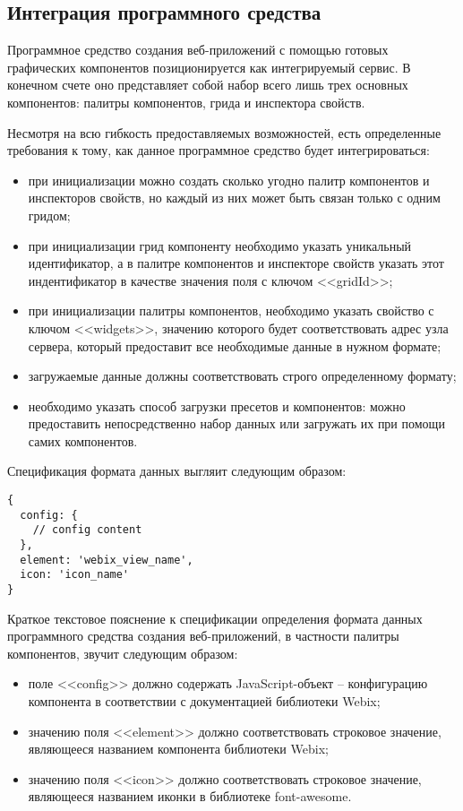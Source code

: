 \subsection{Интеграция программного средства}
\label{sec:manual:integration}

Программное средство создания веб-приложений с помощью готовых графических компонентов позиционируется как интегрируемый сервис. В конечном счете оно представляет собой набор всего лишь трех основных компонентов: палитры компонентов, грида и инспектора свойств. 

Несмотря на всю гибкость предоставляемых возможностей, есть определенные требования к тому, как данное программное средство будет интегрироваться:
\begin{itemize}
	\item при инициализации можно создать сколько угодно палитр компонентов и инспекторов свойств, но каждый из них может быть связан только с одним гридом;
	\item при инициализации грид компоненту необходимо указать уникальный идентификатор, а в палитре компонентов и инспекторе свойств указать этот индентификатор в качестве значения поля с ключом <<gridId>>;
	\item при инициализации палитры компонентов, необходимо указать свойство с ключом <<widgets>>, значению которого будет соответствовать адрес узла сервера, который предоставит все необходимые данные в нужном формате;
	\item загружаемые данные должны соответствовать строго определенному формату;
	\item необходимо указать способ загрузки пресетов и компонентов: можно предоставить непосредственно набор данных или загружать их при помощи самих компонентов. 
\end{itemize}

Спецификация формата данных выгляит следующим образом:
\begin{lstlisting}
{
  config: { 
    // config content
  },
  element: 'webix_view_name',
  icon: 'icon_name'
}
\end{lstlisting}

Краткое текстовое пояснение к спецификации определения формата данных программного средства создания веб-приложений, в частности палитры компонентов, звучит следующим образом:
\begin{itemize}
	\item поле <<config>> должно содержать JavaScript-объект -- конфигурацию компонента в соответствии с документацией библиотеки Webix;
	\item значению поля <<element>> должно соответствовать строковое значение, являющееся названием компонента библиотеки Webix;
	\item значению поля <<icon>> должно соответствовать строковое значение, являющееся названием иконки в библиотеке font-awesome.
\end{itemize}

